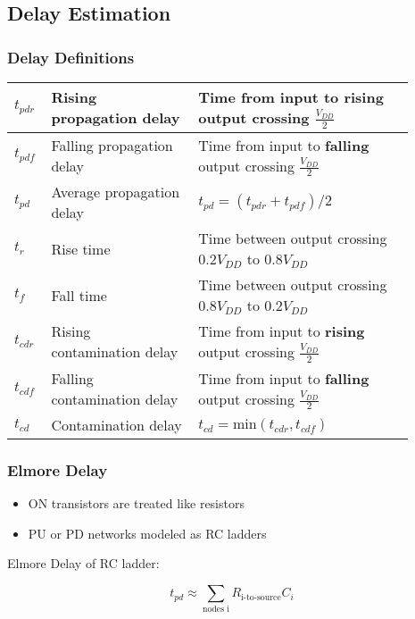 \subsection{Delay Estimation}
    \subsubsection{Delay Definitions}
    \begin{tabular}{| p{0.05\linewidth} | p{0.34\linewidth} | p{0.5\linewidth} |}
        \hline
        $t_{pdr}$ & Rising propagation delay & Time from input to \textbf{rising} output crossing $\frac{V_{DD}}{2}$\\
        \hline
        $t_{pdf}$ & Falling propagation delay & Time from input to \textbf{falling} output crossing $\frac{V_{DD}}{2}$\\
        \hline
        $t_{pd}$ & Average propagation delay & $t_{pd} = (t_{pdr} + t_{pdf})/2$\\
        \hline
        $t_{r}$ & Rise time & Time between output crossing $0.2V_{DD}$ to $0.8V_{DD}$\\
        \hline
        $t_{f}$ & Fall time & Time between output crossing $0.8V_{DD}$ to $0.2V_{DD}$\\
        \hline
        $t_{cdr}$ & Rising contamination delay & Time from input to \textbf{rising} output crossing $\frac{V_{DD}}{2}$\\
        \hline
        $t_{cdf}$ & Falling contamination delay & Time from input to \textbf{falling} output crossing $\frac{V_{DD}}{2}$\\
        \hline
        $t_{cd}$ & Contamination delay & $t_{cd} = \text{min}(t_{cdr},t_{cdf})$\\
        \hline
    \end{tabular}

    \subsubsection{Elmore Delay}
    \begin{itemize}
        \item ON transistors are treated like resistors
        \item PU or PD networks modeled as RC ladders
    \end{itemize}

    Elmore Delay of RC ladder:

    \begin{equation}
        t_{pd} \approx \sum_{\text{nodes i}} R_{\text{i-to-source}}C_i
    \end{equation}

